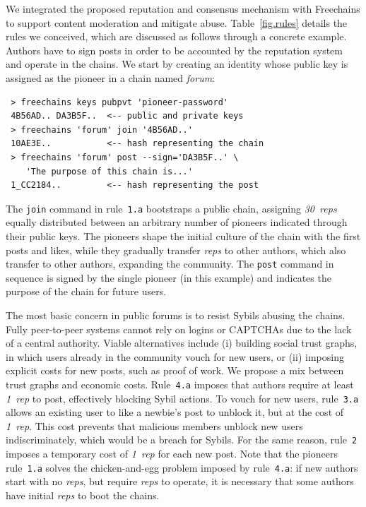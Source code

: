 \documentclass[12pt]{article}
\newcommand{\FC}       {Freechains\xspace}
\newcommand{\reps}     {\emph{reps}\xspace}
\newcommand{\onerep}   {\emph{1~rep}\xspace}
\newcommand{\nreps}[1] {\emph{#1~reps\xspace}}
\newcommand{\code}[1]  {\texttt{\footnotesize{#1}}}
\begin{document}
We integrated the proposed reputation and consensus mechanism with \FC to
support content moderation and mitigate abuse.
Table~\ref{fig.rules} details the rules we conceived, which are discussed as
follows through a concrete example.
Authors have to sign posts in order to be accounted by the reputation system
and operate in the chains.
We start by creating an identity whose public key is assigned as the pioneer in
a chain named \emph{forum}:

{\footnotesize
\begin{verbatim}
 > freechains keys pubpvt 'pioneer-password'
 4B56AD.. DA3B5F..  <-- public and private keys
 > freechains 'forum' join '4B56AD..'
 10AE3E..           <-- hash representing the chain
 > freechains 'forum' post --sign='DA3B5F..' \
    'The purpose of this chain is...'
 1_CC2184..         <-- hash representing the post
\end{verbatim}
}

The \code{join} command in rule~\code{1.a} bootstraps a public chain,
assigning \nreps{30} equally distributed between an arbitrary number of
pioneers indicated through their public keys.
The pioneers shape the initial culture of the chain with the first posts and
likes, while they gradually transfer \reps to other authors, which also
transfer to other authors, expanding the community.
%
The \code{post} command in sequence is signed by the single pioneer (in this
example) and indicates the purpose of the chain for future users.

The most basic concern in public forums is to resist Sybils abusing the
chains.
Fully peer-to-peer systems cannot rely on logins or {\footnotesize CAPTCHAs}
due to the lack of a central authority.
Viable alternatives include (i) building social trust graphs, in which users
already in the community vouch for new users, or (ii) imposing explicit costs
for new posts, such as proof of work.
%
We propose a mix between trust graphs and economic costs.
%
Rule~\code{4.a} imposes that authors require at least \onerep to post,
effectively blocking Sybil actions.
To vouch for new users, rule~\code{3.a} allows an existing user to like a
newbie's post to unblock it, but at the cost of \onerep.
This cost prevents that malicious members unblock new users indiscriminately,
which would be a breach for Sybils.
For the same reason, rule~\code{2} imposes a temporary cost of \onerep for
each new post.
%
Note that the pioneers rule~\code{1.a} solves the chicken-and-egg problem
imposed by rule~\code{4.a}: if new authors start with no \reps, but require
\reps to operate, it is necessary that some authors have initial \reps to boot
the chains.
\end{document}
